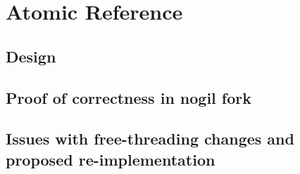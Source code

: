 \chapter{Atomic Reference}

\section{Design}

\section{Proof of correctness in nogil fork}

\section{Issues with free-threading changes and proposed re-implementation}
